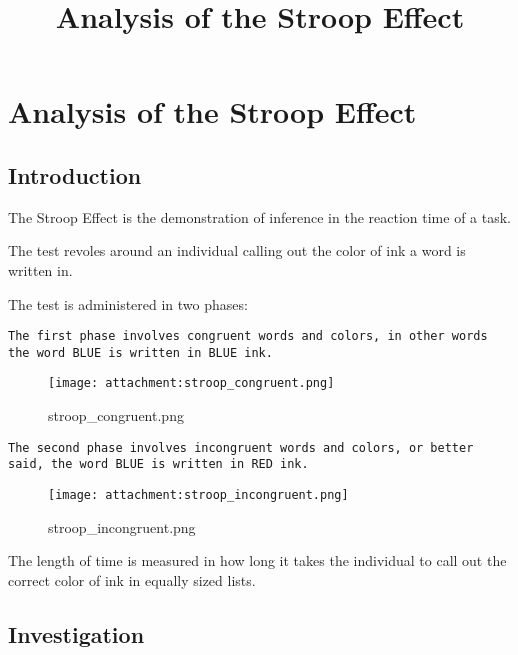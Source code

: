 \documentclass[11pt]{article}
\title{Analysis of the Stroop Effect}
\makeatletter
\def\maxwidth{\ifdim\Gin@nat@width>\linewidth\linewidth
    \else\Gin@nat@width\fi}
\let\Oldincludegraphics\includegraphics
\renewcommand{\includegraphics}[1]{\Oldincludegraphics[width=.8\maxwidth]{#1}}
\makeatother
\begin{document}
    
    
    \maketitle
    
    

    
    \section{Analysis of the Stroop
Effect}\label{analysis-of-the-stroop-effect}

    \subsection{Introduction}\label{introduction}

    The Stroop Effect is the demonstration of inference in the reaction time
of a task.

The test revoles around an individual calling out the color of ink a
word is written in.

The test is administered in two phases:

\begin{verbatim}
The first phase involves congruent words and colors, in other words the word BLUE is written in BLUE ink.
\end{verbatim}

\begin{figure}
\centering
\texttt{[image: attachment:stroop\_congruent.png]}
\caption{stroop\_congruent.png}
\end{figure}

\begin{verbatim}
The second phase involves incongruent words and colors, or better said, the word BLUE is written in RED ink.
\end{verbatim}

\begin{figure}
\centering
\texttt{[image: attachment:stroop\_incongruent.png]}
\caption{stroop\_incongruent.png}
\end{figure}

The length of time is measured in how long it takes the individual to
call out the correct color of ink in equally sized lists.

    \subsection{Investigation}\label{investigation}
\end{document}
